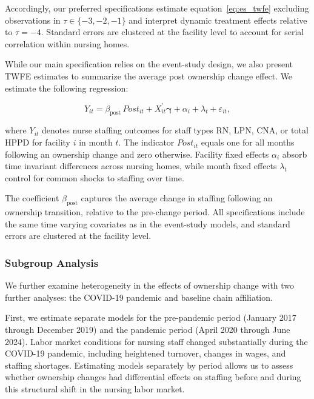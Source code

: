 \documentclass[preprint,authoryear]{elsarticle}
\begin{document}
Accordingly, our preferred specifications estimate equation~\eqref{eq:es_twfe} excluding observations in $\tau\in\{-3,-2,-1\}$ and interpret dynamic treatment effects relative to $\tau=-4$. Standard errors are clustered at the facility level to account for serial correlation within nursing homes.

While our main specification relies on the event-study design, we also present TWFE estimates to summarize the average post ownership change effect. We estimate the following regression:

\begin{equation}
  Y_{it}
  =
  \beta_{\text{post}}\,\textit{Post}_{it}
  +
  X_{it}^{\prime}\boldsymbol{\gamma}
  +
  \alpha_i
  +
  \lambda_t
  +
  \varepsilon_{it},
  \label{eq:twfe-post}
\end{equation}

where $Y_{it}$ denotes nurse staffing outcomes for staff types RN, LPN, CNA, or total HPPD for facility $i$ in month $t$. The indicator $\textit{Post}_{it}$ equals one for all months following an ownership change and zero otherwise. Facility fixed effects $\alpha_i$ absorb time invariant differences across nursing homes, while month fixed effects $\lambda_t$ control for common shocks to staffing over time.

The coefficient $\beta_{\text{post}}$ captures the average change in staffing following an ownership transition, relative to the pre-change period. All specifications include the same time varying covariates as in the event-study models, and standard errors are clustered at the facility level.

\subsubsection{Subgroup Analysis}

We further examine heterogeneity in the effects of ownership change with two further analyses: the COVID-19 pandemic and baseline chain affiliation.

First, we estimate separate models for the pre-pandemic period (January 2017 through December 2019) and the pandemic period (April 2020 through June 2024). Labor market conditions for nursing staff changed substantially during the COVID-19 pandemic, including heightened turnover, changes in wages, and staffing shortages. Estimating models separately by period allows us to assess whether ownership changes had differential effects on staffing before and during this structural shift in the nursing labor market.
\end{document}
